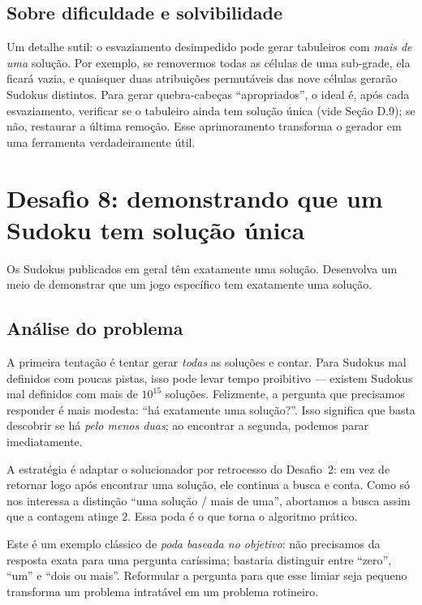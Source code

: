 \documentclass[11pt,a4paper,oneside]{report}
\begin{document}
\subsection{Sobre dificuldade e solvibilidade}

Um detalhe sutil: o esvaziamento desimpedido pode gerar tabuleiros com
\emph{mais de uma} solução. Por exemplo, se removermos todas as células
de uma sub-grade, ela ficará vazia, e quaisquer duas atribuições
permutáveis das nove células gerarão Sudokus distintos. Para gerar
quebra-cabeças ``apropriados'', o ideal é, após cada esvaziamento,
verificar se o tabuleiro ainda tem solução única (vide Seção D.9); se
não, restaurar a última remoção. Esse aprimoramento transforma o gerador
em uma ferramenta verdadeiramente útil.

\section{Desafio 8: demonstrando que um Sudoku tem solução única}

\begin{enunciado}
Os Sudokus publicados em geral têm exatamente uma solução. Desenvolva um
meio de demonstrar que um jogo específico tem exatamente uma solução.
\end{enunciado}

\subsection{Análise do problema}

A primeira tentação é tentar gerar \emph{todas} as soluções e contar.
Para Sudokus mal definidos com poucas pistas, isso pode levar tempo
proibitivo --- existem Sudokus mal definidos com mais de $10^{15}$
soluções. Felizmente, a pergunta que precisamos responder é mais
modesta: ``há exatamente uma solução?''. Isso significa que basta
descobrir se há \emph{pelo menos duas}; ao encontrar a segunda, podemos
parar imediatamente.

A estratégia é adaptar o solucionador por retrocesso do Desafio~2: em
vez de retornar logo após encontrar uma solução, ele continua a busca
e conta. Como só nos interessa a distinção ``uma solução / mais de uma'',
abortamos a busca assim que a contagem atinge $2$. Essa poda é o que
torna o algoritmo prático.

\begin{engenharia}
Este é um exemplo clássico de \emph{poda baseada no objetivo}: não
precisamos da resposta exata para uma pergunta caríssima; bastaria
distinguir entre ``zero'', ``um'' e ``dois ou mais''. Reformular a
pergunta para que esse limiar seja pequeno transforma um problema
intratável em um problema rotineiro.
\end{engenharia}
\end{document}
